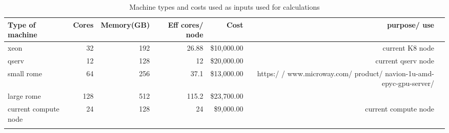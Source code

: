 \tiny \begin{longtable} { |p{}  |r  |r  |r  |r  |r  |r |} 
\caption{Machine types and costs used as inputs used for calculations \label{tab:Machines}}\\ 
\hline 
\textbf{Type of machine }&\textbf{Cores}&\textbf{Memory(GB)}&\textbf{Eff cores/ node}&\textbf{Cost}&\textbf{purpose/ use } \\ \hline
{xeon }&{32}&{192}&{26.88}&{\$10,000.00}&{current K8 node } \\ \hline
{qserv }&{12}&{128}&{12}&{\$20,000.00}&{current qserv node } \\ \hline
{small rome  }&{64}&{256}&{37.1}&{\$13,000.00}&{https:/ / www.microway.com/ product/ navion-1u-amd-epyc-gpu-server/ } \\ \hline
{large rome }&{128}&{512}&{115.2}&{\$23,700.00}& \\ \hline
{current compute node }&{24}&{128}&{24}&{\$9,000.00}&{current compute node} \\ \hline
{}&{}&{}&{}&{}&{} \\ \hline
\end{longtable} \normalsize
